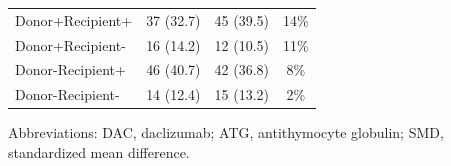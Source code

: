 \documentclass{article}
\begin{document}
\begin{center}
\begin{table}[!ht]
\begin{tabular*}{\textwidth}{@{\extracolsep\fill}lccc@{}}
\hspace{5mm}Donor+Recipient+ & 37 (32.7) & 45 (39.5) & 14\%  \\
\hspace{5mm}Donor+Recipient- & 16 (14.2) & 12 (10.5) & 11\% \\
\hspace{5mm}Donor-Recipient+ & 46 (40.7) & 42 (36.8) & 8\% \\
\hspace{5mm}Donor-Recipient- & 14 (12.4) & 15 (13.2) & 2\% \\
\bottomrule
\end{tabular*}
\begin{tablenotes}%
\item[Abbreviations:] DAC, daclizumab; ATG, antithymocyte globulin; SMD, standardized mean difference.
\end{tablenotes}
\end{table}
\end{center}




\clearpage
\end{document}
